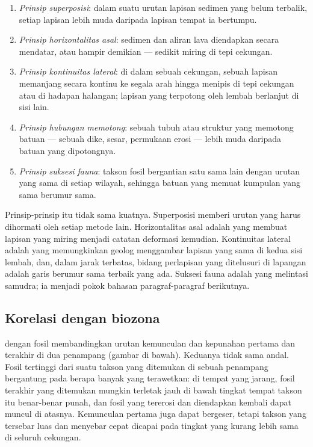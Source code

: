 \begin{definition}\label{def:b1:stratigraphic-scale:principles}
\begin{enumerate}
  \item \emph{Prinsip superposisi}: dalam suatu urutan lapisan sedimen yang belum terbalik, setiap lapisan lebih muda daripada lapisan tempat ia bertumpu.
  \item \emph{Prinsip horizontalitas asal}: sedimen dan aliran lava diendapkan secara mendatar, atau hampir demikian --- sedikit miring di tepi cekungan.
  \item \emph{Prinsip kontinuitas lateral}: di dalam sebuah cekungan, sebuah lapisan memanjang secara kontinu ke segala arah hingga menipis di tepi cekungan atau di hadapan halangan; lapisan yang terpotong oleh lembah berlanjut di sisi lain.
  \item \emph{Prinsip hubungan memotong}: sebuah tubuh atau struktur yang memotong batuan --- sebuah dike, sesar, permukaan erosi --- lebih muda daripada batuan yang dipotongnya.
  \item \emph{Prinsip suksesi fauna}: takson fosil bergantian satu sama lain dengan urutan yang sama di setiap wilayah, sehingga batuan yang memuat kumpulan yang sama berumur sama.
\end{enumerate}
\end{definition}

Prinsip-prinsip itu tidak sama kuatnya. Superposisi memberi urutan yang harus dihormati oleh setiap metode lain. Horizontalitas asal adalah yang membuat lapisan yang miring menjadi catatan deformasi kemudian. Kontinuitas lateral adalah yang memungkinkan geolog menggambar lapisan yang sama di kedua sisi lembah, dan, dalam jarak terbatas, bidang perlapisan yang ditelusuri di lapangan adalah garis berumur sama terbaik yang ada. Suksesi fauna adalah yang melintasi samudra; ia menjadi pokok bahasan paragraf-paragraf berikutnya.

\subsection*{Korelasi dengan biozona}

 dengan fosil membandingkan urutan kemunculan dan kepunahan pertama dan terakhir di dua penampang (gambar di bawah). Keduanya tidak sama andal. Fosil tertinggi dari suatu takson yang ditemukan di sebuah penampang bergantung pada berapa banyak yang terawetkan: di tempat yang jarang, fosil terakhir yang ditemukan mungkin terletak jauh di bawah tingkat tempat takson itu benar-benar punah, dan fosil yang tererosi dan diendapkan kembali dapat muncul di atasnya. Kemunculan pertama juga dapat bergeser, tetapi takson yang tersebar luas dan menyebar cepat dicapai pada tingkat yang kurang lebih sama di seluruh cekungan.

